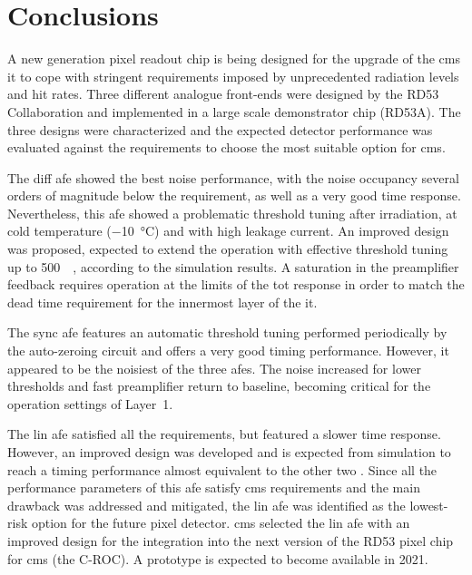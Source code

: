 \section{Conclusions}

A new generation pixel readout chip is being designed for the upgrade of the \gls{cms} \acrlong{it} to cope with stringent requirements imposed by unprecedented radiation levels and hit rates. Three different analogue front-ends were designed by the RD53 Collaboration and implemented in a large scale demonstrator chip (RD53A). The three designs were characterized and the expected detector performance was evaluated against the requirements to choose the most suitable option for \gls{cms}.

The \acrlong{diff} \acrlong{afe} showed the best noise performance, with the noise occupancy several orders of magnitude below the requirement, as well as a very good time response. Nevertheless, this \acrlong{afe} showed a problematic threshold tuning after irradiation, at cold temperature (\SI{-10}{\celsius}) and with high leakage current. An improved design was proposed, expected to extend the operation with effective threshold tuning up to \SI{500}{\mega\rad}, according to the simulation results. %
A saturation in the preamplifier feedback requires operation at the limits of the \acrlong{tot} response in order to match the dead time requirement for the innermost layer of the \acrlong{it}. 

The \acrlong{sync} \acrlong{afe} features an automatic threshold tuning performed periodically by the auto-zeroing circuit and offers a very good timing performance. However, it appeared to be the noisiest of the three \acrlong{afe}s. The noise increased for lower thresholds and fast preamplifier return to baseline, becoming critical for the operation settings of Layer~\num{1}.

The \acrlong{lin} \acrlong{afe} satisfied all the requirements, but featured a slower time response.
However, an improved design was developed and is expected from simulation to reach a timing performance almost equivalent to the other two . Since all the performance parameters of this \acrlong{afe} satisfy \gls{cms} requirements and the main drawback was addressed and mitigated, the \acrlong{lin} \acrlong{afe} was identified as the lowest-risk option for the future pixel detector. \gls{cms} selected the \acrlong{lin} \acrlong{afe} with an improved design for the integration into the next version of the RD53 pixel chip for \gls{cms} (the C-ROC). A prototype is expected to become available in 2021.


